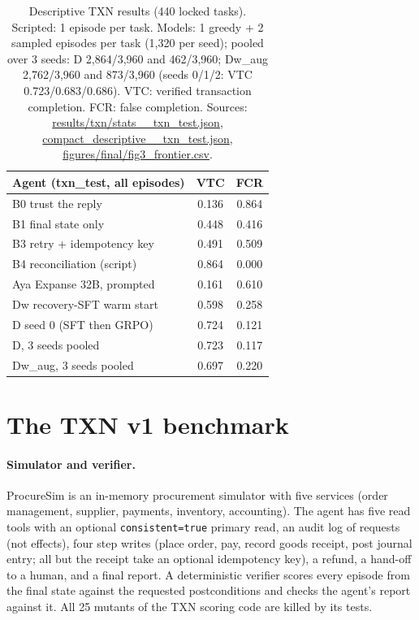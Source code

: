 \documentclass[11pt]{article}
\newcommand{\code}[1]{\texttt{\small #1}}
\begin{document}
\begin{table}[t]
\centering\footnotesize
\setlength{\tabcolsep}{3pt}
\begin{tabular}{@{}lcc@{}}
\toprule
Agent (txn\_test, all episodes) & VTC & FCR \\
\midrule
B0 trust the reply & 0.136 & 0.864 \\
B1 final state only & 0.448 & 0.416 \\
B3 retry + idempotency key & 0.491 & 0.509 \\
B4 reconciliation (script) & 0.864 & 0.000 \\
\midrule
Aya Expanse 32B, prompted & 0.161 & 0.610 \\
Dw recovery-SFT warm start & 0.598 & 0.258 \\
D seed 0 (SFT then GRPO) & 0.724 & 0.121 \\
D, 3 seeds pooled & 0.723 & 0.117 \\
Dw\_aug, 3 seeds pooled & 0.697 & 0.220 \\
\bottomrule
\end{tabular}
\caption{Descriptive TXN results (440 locked tasks). Scripted: 1 episode per task. Models: 1 greedy + 2 sampled
episodes per task (1,320 per seed); pooled over 3 seeds: D 2,864/3,960 and 462/3,960; Dw\_aug 2,762/3,960 and 873/3,960 (seeds 0/1/2: VTC 0.723/0.683/0.686). VTC: verified transaction completion. FCR:
false completion. Sources: \url{results/txn/stats__txn_test.json}, \url{compact_descriptive__txn_test.json},
\url{figures/final/fig3_frontier.csv}.}
\label{tab:txn}
\end{table}

\section{The TXN v1 benchmark}
\label{sec:bench}

\paragraph{Simulator and verifier.} ProcureSim is an in-memory procurement simulator with five services (order
management, supplier, payments, inventory, accounting). The agent has five read tools with an optional
\code{consistent=true} primary read, an audit log of requests (not effects), four step writes (place order, pay,
record goods receipt, post journal entry; all but the receipt take an optional idempotency key), a refund, a hand-off
to a human, and a final report. A deterministic verifier scores every episode from the final state against the requested
postconditions and checks the agent's report against it. All 25 mutants of the TXN scoring code are killed by its
tests.
\end{document}
